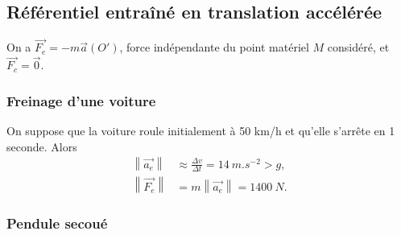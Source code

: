     \subsection[Référentiel entraîné en translation accélérée]{Référentiel entraîné en translation accélérée}

        On a $\vec{F_e}=-m\vec{a}(O')$, force indépendante du point matériel $M$ considéré, et $\vec{F_c}=\vec{0}$.

        \subsubsection{Freinage d'une voiture}

            On suppose que la voiture roule initialement à 50 km/h et qu'elle s'arrête en 1 seconde. Alors
            \begin{equation*}
                \begin{aligned}
                    \left\lVert\vec{a_e}\right\rVert&\approx\frac{\Delta v}{\Delta t}=14~m.s^{-2}>g,\\
                    \left\lVert\vec{F_e}\right\rVert&=m\left\lVert \vec{a_e}\right\rVert=1400~N.
                \end{aligned}
            \end{equation*}

        \subsubsection{Pendule secoué}

